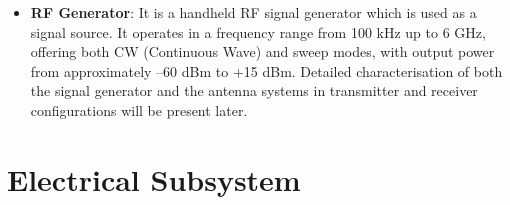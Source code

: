 \begin{itemize}
\item \textbf{RF Generator}: It is a handheld RF signal generator which is used as a signal source. It operates in a frequency range from 100 kHz up to 6 GHz, offering both CW (Continuous Wave) and sweep modes, with output power from approximately –60 dBm to +15 dBm. Detailed characterisation of both the signal generator and the antenna systems in transmitter and receiver configurations will be present later.

\end{itemize}




\section{Electrical Subsystem}
\label{subsec:electrical_subsystem}



